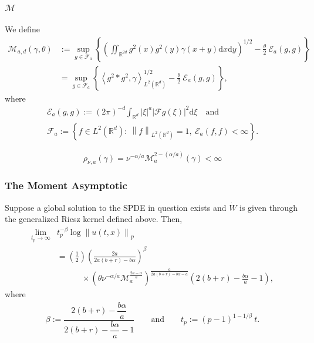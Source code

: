 \documentclass{beamer}%
\numberwithin{equation}{section}
\newcommand{\R}{\mathbb{R}}
\newcommand{\Norm}[1]{\left\|  #1   \right\|}
\newcommand{\ud}{\ensuremath{\mathrm{d} }}
\begin{document}
	\begin{frame}[t]%
		\frametitle{$\mathcal{M}$}
		We define
		\begin{align*}
		\mathcal{M}_{a,d}(\gamma,\theta) & := \sup_{g \in \mathcal{F}_a} \left\{ \left( \iint_{\R^{2d}} g^2(x)g^2(y) \gamma(x+y)\ud x\ud y \right)^{1/2} - \frac{\theta}{2}\: \mathcal{E}_a(g,g) \right\} \\
		& = \sup_{g \in \mathcal{F}_a} \left\{ \left\langle g^2 * g^2, \gamma \right\rangle_{L^2(\R^d)}^{1/2} - \frac{\theta}{2}\: \mathcal{E}_a(g,g) \right\},
		\end{align*}
		where
		\begin{gather*}
		\mathcal{E}_a(g,g) := (2\pi)^{-d} \int_{\R^d} |\xi|^a |\mathcal{F}g(\xi)|^2 \ud \xi \quad \text{and} \\
		\mathcal{F}_a      := \left\{f\in L^2(\R^d): \: \Norm{f}_{L^2(\R^d)}=1,\: \mathcal{E}_a(f,f)<\infty \right\}.
		\end{gather*}
		
			\begin{theorem}
			\[
			\rho_{\nu,a}(\gamma) = \nu^{-\alpha/a} \mathcal{M}_a^{2-(\alpha / a)}(\gamma)<\infty
			\]
		\end{theorem}
	\end{frame}%
	
	\begin{frame}[t]%
		\frametitle{The Moment Asymptotic}
		\begin{theorem}
			Suppose a global solution to the SPDE in question exists and $\dot{W}$ is given through the generalized Riesz kernel defined above. Then,
			\begin{align*}
			\lim_{t_p \to \infty} & t_p^{-\beta} \log \Norm{u(t,x)}_p                                          \\
			& =  \left(\frac{1}{2}\right)\left(\frac{2a}{2a(b+r)- b\alpha} \right)^\beta \\
			& \quad \quad \quad  \times \left(\theta\nu^{-\alpha/a} \mathcal{M}_a^{\frac{2a-\alpha}{a}}\right)^{\frac{a}{2a(b+r)-b\alpha-a}}\left(2(b+r)-\frac{b\alpha}{a}-1\right),
			\end{align*}
			where
			\begin{align*}
			\beta := \dfrac{2(b+r)-\dfrac{b\alpha}{a}}{ 2(b+r)-\dfrac{b\alpha}{a} -1 } \qquad \text{and} \qquad
			t_p   := (p-1)^{1-1/\beta} \: t.
			\end{align*}
		\end{theorem}
	\end{frame}%
	
\end{document}
